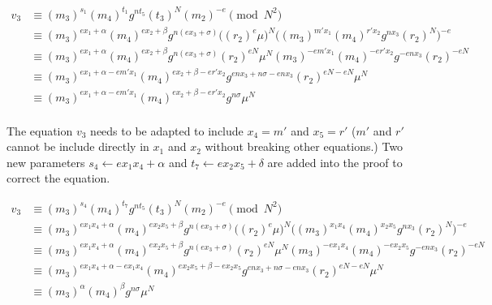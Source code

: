 \begin{equation*}
\begin{split}
   v_3 &\equiv (m_3)^{s_1} (m_4)^{t_1} g^{nt_5} (t_3)^{N} (m_2)^{-e} \pmod{N^2} \\
       &\equiv (m_3)^{ex_1 + \alpha} (m_4)^{ex_2 + \beta} g^{n(ex_3 + \sigma)}
       \big((r_2)^e \mu\big)^{N}
       \big((m_3)^{m' x_1} (m_4)^{r' x_2} g^{nx_3} (r_2)^{N}\big)^{-e} \\
       &\equiv (m_3)^{ex_1 + \alpha} (m_4)^{ex_2 + \beta} g^{n(ex_3 + \sigma)}
       (r_2)^{eN} \mu^{N}
       (m_3)^{-e m' x_1} (m_4)^{-e r' x_2} g^{-e nx_3} (r_2)^{-eN} \\
       &\equiv (m_3)^{ex_1 + \alpha - e m' x_1} (m_4)^{ex_2 + \beta - e r' x_2}
       g^{enx_3 + n\sigma - enx_3} (r_2)^{eN - eN} \mu^{N}  \\
       &\equiv (m_3)^{ex_1 + \alpha - e m' x_1} (m_4)^{ex_2 + \beta - e r' x_2}
       g^{n\sigma} \mu^{N}  \\
\end{split}
\end{equation*}

The equation $v_3$ needs to be adapted to include $x_4 = m'$ and $x_5 = r'$ ($m'$
and $r'$ cannot be include directly in $x_1$ and $x_2$ without breaking other
equations.) Two new parameters $s_4 \leftarrow ex_1 x_4 + \alpha$ and
$t_7 \leftarrow ex_2 x_5 + \delta$ are added into the proof to correct
the equation.

\begin{equation*}
\begin{split}
   v_3 &\equiv (m_3)^{s_4} (m_4)^{t_7} g^{nt_5} (t_3)^{N} (m_2)^{-e} \pmod{N^2} \\
       &\equiv (m_3)^{ex_1x_4 + \alpha} (m_4)^{ex_2x_5 + \beta} g^{n(ex_3 + \sigma)}
       \big((r_2)^e \mu\big)^{N}
       \big((m_3)^{x_1x_4} (m_4)^{x_2x_5} g^{nx_3} (r_2)^{N}\big)^{-e} \\
       &\equiv (m_3)^{ex_1x_4 + \alpha} (m_4)^{ex_2x_5 + \beta} g^{n(ex_3 + \sigma)}
       (r_2)^{eN} \mu^{N}
       (m_3)^{-e x_1x_4} (m_4)^{-e x_2x_5} g^{-e nx_3} (r_2)^{-eN} \\
       &\equiv (m_3)^{ex_1x_4 + \alpha - e x_1x_4} (m_4)^{ex_2x_5 + \beta - e x_2x_5}
       g^{enx_3 + n\sigma - enx_3} (r_2)^{eN - eN} \mu^{N}  \\
       &\equiv (m_3)^{\alpha} (m_4)^{\beta} g^{n\sigma} \mu^{N} \\
\end{split}
\end{equation*}


